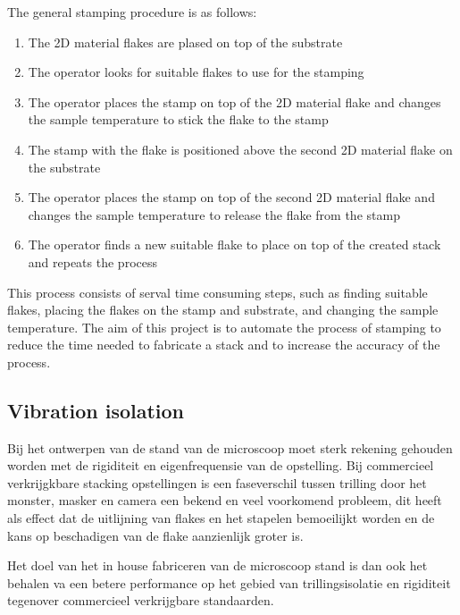 \documentclass[11pt]{article}
\begin{document}
 The general stamping procedure is as follows:
 \begin{enumerate}[noitemsep]
  \item The 2D material flakes are plased on top of the substrate
  \item The operator looks for suitable flakes to use for the stamping
  \item The operator places the stamp on top of the 2D material flake and changes the sample temperature to stick the flake to the stamp
  \item The stamp with the flake is positioned above the second 2D material flake on the substrate
  \item The operator places the stamp on top of the second 2D material flake and changes the sample temperature to release the flake from the stamp
  \item The operator finds a new suitable flake to place on top of the created stack and repeats the process
 \end{enumerate}

 This process consists of serval time consuming steps, such as finding suitable flakes, placing the flakes on the stamp and substrate, and changing the sample temperature.
 The aim of this project is to automate the process of stamping to reduce the time needed to fabricate a stack and to increase the accuracy of the process.

\subsection{Vibration isolation}
Bij het ontwerpen van de stand van de microscoop moet sterk rekening gehouden worden met de rigiditeit en eigenfrequensie van de opstelling. 
Bij commercieel verkrijgkbare stacking opstellingen is een faseverschil tussen trilling door het monster, masker en camera een bekend en veel voorkomend probleem, dit heeft als effect dat de uitlijning van flakes en het stapelen bemoeilijkt worden en de kans op beschadigen van de flake aanzienlijk groter is.


Het doel van het in house fabriceren van de microscoop stand is dan ook het behalen va een betere performance op het gebied van trillingsisolatie en rigiditeit tegenover commercieel verkrijgbare standaarden.
\end{document}

